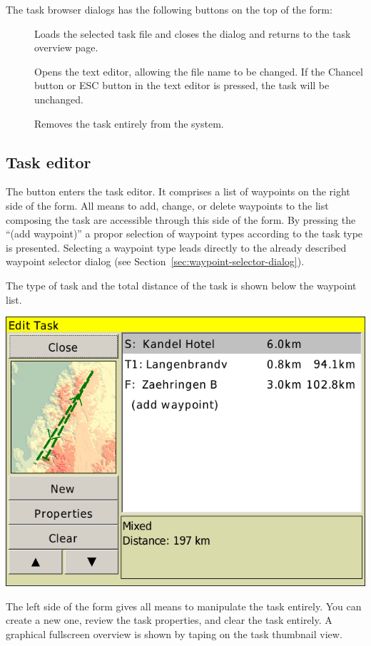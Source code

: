\documentclass[a4paper,12pt]{refrep}
\begin{document}
The task browser dialogs has the following buttons on the
top of the form:
\begin{description}
\item[] Loads the selected task file and closes the dialog and
returns to the task overview page.
\item[] Opens the text editor, allowing the
file name to be changed.  If the Chancel button or ESC button in the
text editor is pressed, the task will be unchanged.
\item[] Removes the task entirely from the system.
\end{description}


\subsection*{Task editor}
The  button enters the task editor. It comprises a list of 
waypoints on the right side of the form. All means to add, change, or
delete waypoints to the list composing the task are accessible through this
side of the form. By pressing the ``(add waypoint)'' a propor selection of
waypoint types according to the task type is presented. Selecting a waypoint
type leads directly to the already described waypoint selector dialog (see
Section~\ref{sec:waypoint-selector-dialog}).

The type of task and the total distance of the task is shown below the waypoint
list.
\begin{center}
\includegraphics[angle=0,width=0.8\linewidth,keepaspectratio='true']{figures/dialog-taskedit0.png}
\end{center}

The left side of the form gives all means to manipulate the task entirely. You
can create a new one, review the task properties, and clear the task entirely. A
graphical fullscreen overview is shown by taping on the task thumbnail view.
\end{document}
